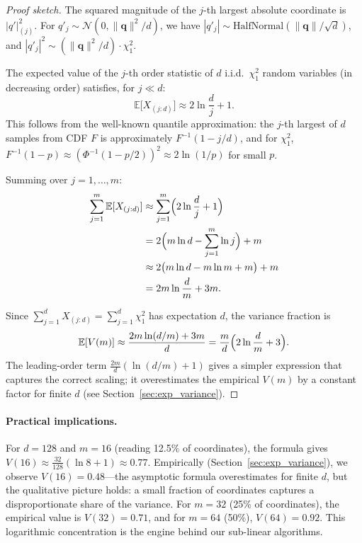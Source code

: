 \documentclass[10pt,twocolumn]{article}
\theoremstyle{definition}
\newcommand{\E}{\mathbb{E}}
\newcommand{\calN}{\mathcal{N}}
\newcommand{\bq}{\mathbf{q}}
\begin{document}
\begin{proof}[Proof sketch]
  The squared magnitude of the $j$-th largest absolute coordinate is
  $|q'|_{(j)}^2$.  For $q'_j \sim \calN(0, \|\bq\|^2/d)$, we have
  $|q'_j| \sim \text{HalfNormal}(\|\bq\|/\sqrt{d})$, and $|q'_j|^2 \sim
  (\|\bq\|^2/d) \cdot \chi^2_1$.

  The expected value of the $j$-th order statistic of $d$ i.i.d.\ $\chi^2_1$
  random variables (in decreasing order) satisfies, for $j \ll d$:
  \begin{equation}
    \E\bigl[X_{(j:d)}\bigr] \approx 2\ln\frac{d}{j} + 1.
  \end{equation}
  This follows from the well-known quantile approximation: the $j$-th largest of
  $d$ samples from CDF $F$ is approximately $F^{-1}(1 - j/d)$, and for $\chi^2_1$,
  $F^{-1}(1-p) \approx (\Phi^{-1}(1-p/2))^2 \approx 2\ln(1/p)$ for small $p$.

  Summing over $j = 1, \ldots, m$:
  \begin{align}
    \sum_{j=1}^{m} \E[X_{(j:d)}]
      &\approx \sum_{j=1}^{m} \Bigl(2\ln\frac{d}{j} + 1\Bigr) \nonumber \\
      &= 2\Bigl(m\ln d - \sum_{j=1}^{m}\ln j\Bigr) + m \nonumber \\
      &\approx 2\bigl(m\ln d - m\ln m + m\bigr) + m \nonumber \\
      &= 2m\ln\frac{d}{m} + 3m. \label{eq:sum_order}
  \end{align}

  Since $\sum_{j=1}^{d} X_{(j:d)} = \sum_{j=1}^d \chi^2_1$ has expectation $d$,
  the variance fraction is
  \[
    \E[V(m)] \approx \frac{2m\ln(d/m) + 3m}{d}
             = \frac{m}{d}\Bigl(2\ln\frac{d}{m} + 3\Bigr).
  \]
  The leading-order term $\frac{2m}{d}(\ln(d/m) + 1)$ gives a simpler expression
  that captures the correct scaling; it overestimates the empirical $V(m)$ by
  a constant factor for finite $d$ (see Section~\ref{sec:exp_variance}).
\end{proof}

\paragraph{Practical implications.}
For $d = 128$ and $m = 16$ (reading 12.5\% of coordinates), the formula gives
$V(16) \approx \frac{32}{128}(\ln 8 + 1) \approx 0.77$.  Empirically
(Section~\ref{sec:exp_variance}), we observe $V(16) = 0.48$---the asymptotic
formula overestimates for finite $d$, but the qualitative picture holds:
a small fraction of coordinates captures a disproportionate share of the
variance.  For $m = 32$ (25\% of coordinates), the empirical value is
$V(32) = 0.71$, and for $m = 64$ (50\%), $V(64) = 0.92$.
This logarithmic concentration is the engine behind our sub-linear algorithms.
\end{document}
